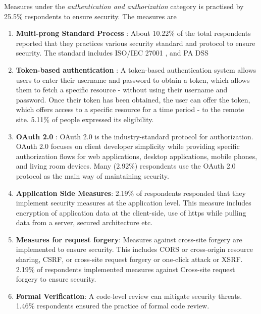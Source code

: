 Measures under the \emph{authentication and authorization} category is practised by 25.5\% respondents to ensure security. The measures are 
\begin{enumerate}[label=(\alph*)]

    \item \textbf{Multi-prong Standard Process} : About 10.22\% of the total respondents reported that they practices various security standard and protocol to ensure security. The standard includes ISO/IEC 27001 , and PA DSS
    
    \item \textbf{Token-based authentication} : A token-based authentication system allows users to enter their username and password to obtain a token, which allows them to fetch a specific resource - without using their username and password. Once their token has been obtained, the user can offer the token, which offers access to a specific resource for a time period - to the remote site. 5.11\% of people expressed its eligibility.
    
    \item \textbf{OAuth 2.0} : OAuth 2.0 is the industry-standard protocol for authorization. OAuth 2.0 focuses on client developer simplicity while providing specific authorization flows for web applications, desktop applications, mobile phones, and living room devices. Many (2.92\%) respondents use the OAuth 2.0 protocol as the main way of maintaining security.
    
    \item \textbf{Application Side Measures}: 2.19\% of respondents responded that they implement security measures at the application level. This measure includes encryption of application data at the client-side, use of https while pulling data from a server, secured architecture etc.
    
    \item \textbf{Measures for request forgery}: Measures against cross-site forgery are implemented to ensure security. This includes CORS or cross-origin resource sharing, CSRF, or cross-site request forgery or one-click attack or XSRF. 2.19\% of respondents implemented measures against  Cross-site request forgery to ensure security.
    
    \item \textbf{Formal Verification}: A code-level review can mitigate security threats. 1.46\% respondents ensured the practice of formal code review.
    
\end{enumerate}

